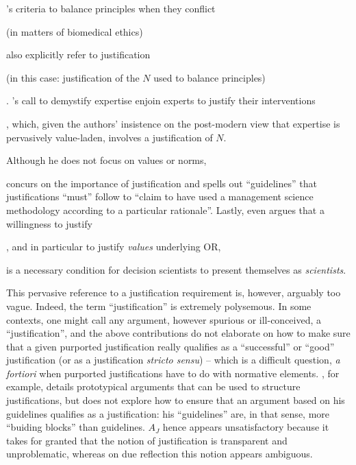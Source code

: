 \documentclass[preprint, french, english, 11pt, authoryear]{elsarticle}%
\newcommand{\possessivecite}[1]{\citeauthor{#1}’s \citeyearpar{#1}}
\begin{document}
 \possessivecite{beauchamp_principles_2009} criteria to balance principles when they conflict \begin{changebar}(in matters of biomedical ethics)\end{changebar} also explicitly refer to justification \begin{changebar}(in this case: justification of the $N$ used to balance principles)\end{changebar}.
\possessivecite{white_death_1994} call to demystify expertise enjoin experts to justify their interventions\begin{changebar}, which, given the authors' insistence on the post-modern view that expertise is pervasively value-laden, involves a justification of $N$.\end{changebar}
\begin{changebar}Although he does not focus on values or norms,\end{changebar} \citet{jackson_towards_1999} concurs on the importance of justification and spells out ``guidelines'' that justifications ``must'' follow to “claim to have used a management science methodology according to a particular rationale''.
Lastly, \citet{ormerod_justifying_2010} even argues that a willingness to justify\begin{changebar}, and in particular to justify \emph{values} underlying OR,\end{changebar} is a necessary condition for decision scientists to present themselves as \emph{scientists}.

 
This pervasive reference to a justification requirement is, however, arguably too vague. Indeed, the term ``justification'' is extremely polysemous. 
In some contexts, one might call any argument, however spurious or ill-conceived, a ``justification'', and the above contributions do not elaborate on how to make sure that a given purported justification really qualifies as a ``successful'' or ``good'' justification (or as a justification \emph{stricto sensu}) -- which is a difficult question, \emph{a fortiori} when purported justifications have to do with normative elements.
\citet{jackson_towards_1999}, for example, details prototypical arguments that can be used to structure justifications, but does not explore how to ensure that an argument based on his guidelines qualifies as a justification: his ``guidelines'' are, in that sense, more ``buiding blocks'' than guidelines. 
$A_J$ hence appears unsatisfactory because it takes for granted that the notion of justification is transparent and unproblematic, whereas on due reflection this notion appears ambiguous.
\end{document}
